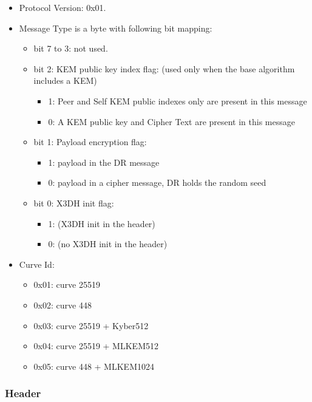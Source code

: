 \documentclass[a4paper,11pt]{article}
\begin{document}
      \begin{itemize}
      \item Protocol Version: 0x01.
      \item Message Type is a byte with following bit mapping:
        \begin{itemize}
          \item bit 7 to 3: not used.
          \item bit 2: KEM public key index flag: (used only when the base algorithm includes a KEM)
            \begin{itemize}
              \item 1: Peer and Self KEM public indexes only are present in this message
              \item 0: A KEM public key and Cipher Text are present in this message
            \end{itemize}
          \item bit 1: Payload encryption flag:
            \begin{itemize}
              \item 1: payload in the DR message
              \item 0: payload in a cipher message, DR holds the random seed
            \end{itemize}
          \item bit 0: X3DH init flag:
            \begin{itemize}
              \item 1: (X3DH init in the header)
              \item 0: (no X3DH init in the header)
            \end{itemize}
        \end{itemize}
      \item Curve Id:
      \begin{itemize}
       \item 0x01: curve 25519
       \item 0x02: curve 448
       \item 0x03: curve 25519 + Kyber512
       \item 0x04: curve 25519 + MLKEM512
       \item 0x05: curve 448 + MLKEM1024
      \end{itemize}
      \end{itemize}

      \subsubsection{Header}
      \label{subsubsec:protocol_doubleratchet_header}
\end{document}
